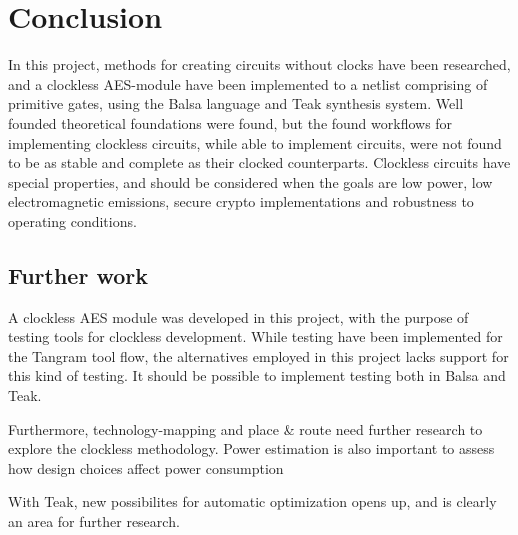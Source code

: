 \section{Conclusion}

In this project, methods for creating circuits without clocks have
been researched, and a clockless AES-module have been implemented to a
netlist comprising of primitive gates, using the Balsa language and
Teak synthesis system. Well founded theoretical foundations were
found, but the found workflows for implementing clockless circuits,
while able to implement circuits, were not found to be as stable and
complete as their clocked counterparts. Clockless circuits have
special properties, and should be considered when the goals are low
power, low electromagnetic emissions, secure crypto implementations
and robustness to operating conditions.

\subsection{Further work}

A clockless AES module was developed in this project, with the purpose
of testing tools for clockless development. While testing have been
implemented for the Tangram tool flow, the alternatives employed in
this project lacks support for this kind of testing. It should be
possible to implement testing both in Balsa and Teak.

Furthermore, technology-mapping and place \& route need further
research to explore the clockless methodology. Power estimation is
also important to assess how design choices affect power consumption

With Teak, new possibilites for automatic optimization opens up, and
is clearly an area for further research.

